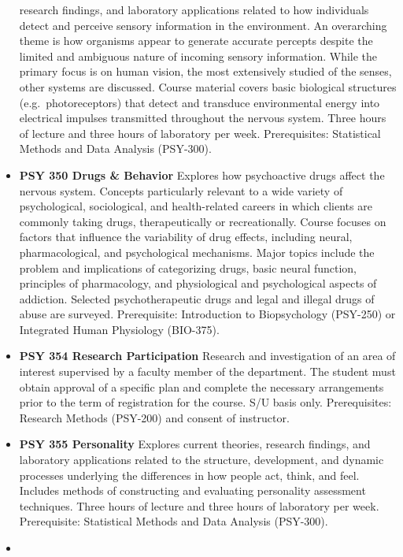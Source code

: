 \documentclass[
  letterpaper,
]{scrbook}
\begin{document}
\begin{itemize}
  research findings, and laboratory applications related to how
  individuals detect and perceive sensory information in the
  environment. An overarching theme is how organisms appear to generate
  accurate percepts despite the limited and ambiguous nature of incoming
  sensory information. While the primary focus is on human vision, the
  most extensively studied of the senses, other systems are discussed.
  Course material covers basic biological structures
  (e.g.~photoreceptors) that detect and transduce environmental energy
  into electrical impulses transmitted throughout the nervous system.
  Three hours of lecture and three hours of laboratory per week.
  Prerequisites: Statistical Methods and Data Analysis (PSY-300).\\
\item
  \textbf{PSY 350 Drugs \& Behavior} Explores how psychoactive drugs
  affect the nervous system. Concepts particularly relevant to a wide
  variety of psychological, sociological, and health-related careers in
  which clients are commonly taking drugs, therapeutically or
  recreationally. Course focuses on factors that influence the
  variability of drug effects, including neural, pharmacological, and
  psychological mechanisms. Major topics include the problem and
  implications of categorizing drugs, basic neural function, principles
  of pharmacology, and physiological and psychological aspects of
  addiction. Selected psychotherapeutic drugs and legal and illegal
  drugs of abuse are surveyed. Prerequisite: Introduction to
  Biopsychology (PSY-250) or Integrated Human Physiology (BIO-375).
\item
  \textbf{PSY 354 Research Participation} Research and investigation of
  an area of interest supervised by a faculty member of the department.
  The student must obtain approval of a specific plan and complete the
  necessary arrangements prior to the term of registration for the
  course. S/U basis only. Prerequisites: Research Methods (PSY-200) and
  consent of instructor.
\item
  \textbf{PSY 355 Personality} Explores current theories, research
  findings, and laboratory applications related to the structure,
  development, and dynamic processes underlying the differences in how
  people act, think, and feel. Includes methods of constructing and
  evaluating personality assessment techniques. Three hours of lecture
  and three hours of laboratory per week. Prerequisite: Statistical
  Methods and Data Analysis (PSY-300).\\
\item

\end{itemize}
\end{document}
